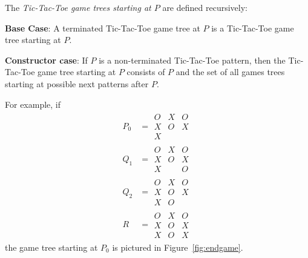 \begin{definition}
\begin{definition}
\begin{itemize}
\end{itemize}

The \emph{Tic-Tac-Toe game trees starting at $P$} are defined recursively:

\textbf{Base Case}:
A terminated Tic-Tac-Toe game tree at $P$ is a Tic-Tac-Toe game tree
starting at $P$.

\textbf{Constructor case}: If $P$ is a non-terminated Tic-Tac-Toe pattern,
then the Tic-Tac-Toe game tree starting at $P$ consists of $P$ and the set
of all games trees starting at possible next patterns after $P$.
\end{definition}

For example, if
\begin{align*}
P_0 & =  \begin{array}{c|c|c}
                O & X & O\\
         \hline X & O & X\\
         \hline X & &
        \end{array}\\
Q_1 & = \begin{array}{c|c|c}
                O & X & O\\
         \hline X & O & X\\
         \hline X &  & O
        \end{array}\\
Q_2 & = \begin{array}{c|c|c}
                O & X & O\\
         \hline X & O & X\\
         \hline X & O & 
        \end{array}\\
R & = \begin{array}{c|c|c}
                O & X & O\\
         \hline X & O & X\\
         \hline X & O & X
        \end{array}
\end{align*}
the game tree starting at $P_0$ is pictured in Figure~\ref{fig:endgame}.

\end{definition}
